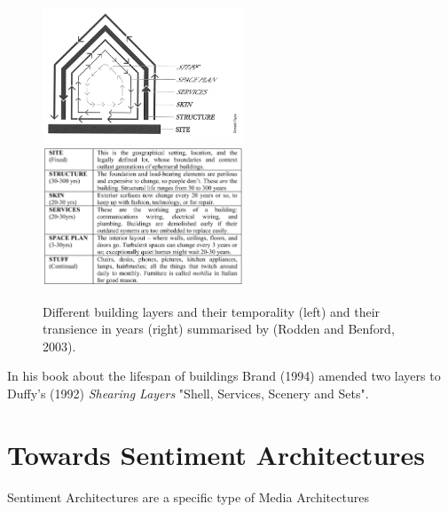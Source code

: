 \begin{figure}[htp]
\centering
\includegraphics[width=6cm]{Illustrations/BrandBuilding.png}
\includegraphics[width=6cm]{Illustrations/Rodden.png}
\caption[SHEARING LAYERS OF CHANGE]{Different building layers and their temporality (left) and their transience in years (right) summarised by (Rodden and Benford, 2003).}
\label{BrandBuilding}
\end{figure}


In his book about the lifespan of buildings Brand (1994) amended two layers to Duffy’s (1992) \textit{Shearing Layers}  "Shell, Services, Scenery and Sets". 



\section {Towards Sentiment Architectures}

Sentiment Architectures are a specific type of Media Architectures


